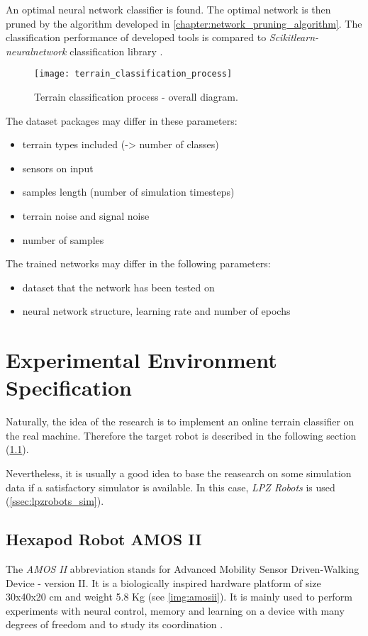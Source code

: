 An optimal neural network classifier is found. The optimal network is then pruned by the algorithm developed in \cref{chapter:network_pruning_algorithm}. The classification performance of developed tools is compared to \textit{Scikitlearn-neuralnetwork} classification library \citep{misc:sknn}.

\begin{figure}[H]
  \centering
  \texttt{[image: terrain\_classification\_process]}
  \caption{Terrain classification process - overall diagram.}
  \label{img:terrain_classification_process}
\end{figure}

The dataset packages may differ in these parameters:
\begin{itemize}
\item terrain types included (-> number of classes)
\item sensors on input
\item samples length (number of simulation timesteps)
\item terrain noise and signal noise
\item number of samples
\end{itemize}

The trained networks may differ in the following parameters:
\begin{itemize}
\item dataset that the network has been tested on
\item neural network structure, learning rate and number of epochs
\end{itemize}

\section{Experimental Environment Specification}
Naturally, the idea of the research is to implement an online terrain classifier on the real machine. Therefore the target robot is described in the following section (\ref{ssec:amosii}).

Nevertheless, it is usually a good idea to base the reasearch on some simulation data if a satisfactory simulator is available. In this case, \textit{LPZ Robots} \citep{misc:lpzrobots} is used (\cref{ssec:lpzrobots_sim}).

\subsection{Hexapod Robot AMOS II} \label{ssec:amosii}
The \textit{AMOS II} abbreviation stands for Advanced Mobility Sensor Driven-Walking Device - version II. It is a biologically inspired hardware platform of size 30x40x20 cm and weight 5.8 Kg (see \cref{img:amosii}). It is mainly used to perform experiments with neural control, memory and learning on a device with many degrees of freedom and to study its coordination \citep{misc:amosii}.

